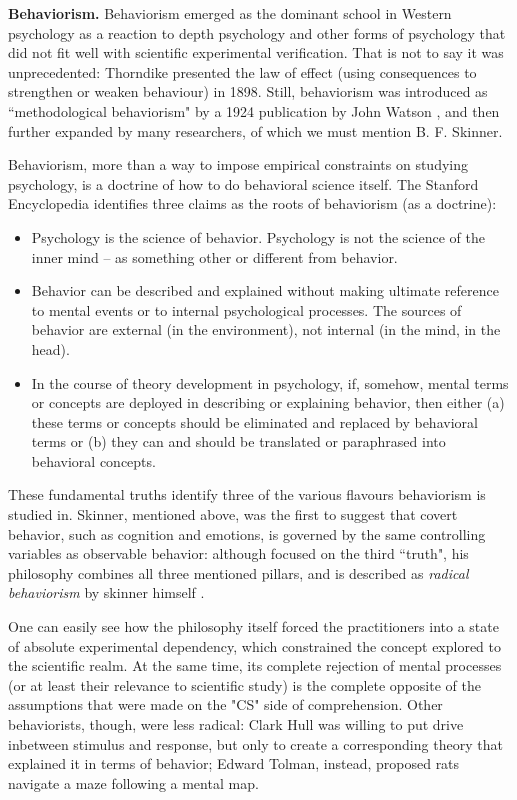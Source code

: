 \documentclass[../main.tex]{subfiles}
\begin{document}
\vspace{4pt}
\textbf{Behaviorism.}
Behaviorism emerged as the dominant school in Western psychology as a reaction to depth psychology and other forms of psychology that did not fit well with scientific experimental verification. That is not to say it was unprecedented: Thorndike presented the law of effect (using consequences to strengthen or weaken behaviour) in 1898. Still, behaviorism was introduced as ``methodological behaviorism" by a 1924 publication by John Watson \cite{watsonUnverbalizedHumanBehavior1924}, and then further expanded by many researchers, of which we must mention B. F. Skinner.

Behaviorism, more than a way to impose empirical constraints on studying psychology, is a doctrine of how to do behavioral science itself. The Stanford Encyclopedia identifies three claims as the roots of behaviorism (as a doctrine):
\begin{itemize}
    \item Psychology is the science of behavior. Psychology is not the science of the inner mind – as something other or different from behavior.
    \item Behavior can be described and explained without making ultimate reference to mental events or to internal psychological processes. The sources of behavior are external (in the environment), not internal (in the mind, in the head).
    \item In the course of theory development in psychology, if, somehow, mental terms or concepts are deployed in describing or explaining behavior, then either (a) these terms or concepts should be eliminated and replaced by behavioral terms or (b) they can and should be translated or paraphrased into behavioral concepts.
\end{itemize}
These fundamental truths identify three of the various flavours behaviorism is studied in. Skinner, mentioned above, was the first to suggest that covert behavior, such as cognition and emotions, is governed by the same controlling variables as observable behavior: although focused on the third ``truth", his philosophy combines all three mentioned pillars, and is described as \textit{radical behaviorism} by skinner himself \cite{skinnerBehaviorism1974}.

One can easily see how the philosophy itself forced the practitioners into a state of absolute experimental dependency, which constrained the concept explored to the scientific realm. At the same time, its complete rejection of mental processes (or at least their relevance to scientific study) is the complete opposite of the assumptions that were made on the "CS" side of comprehension. Other behaviorists, though, were less radical: Clark Hull was willing to put drive inbetween stimulus and response, but only to create a corresponding theory that explained it in terms of behavior\cite{hullGoalAttractionDirecting1931}; Edward Tolman, instead, proposed rats navigate a maze following a mental map\cite{tolmanCognitiveMapsRats1948}.
\end{document}
